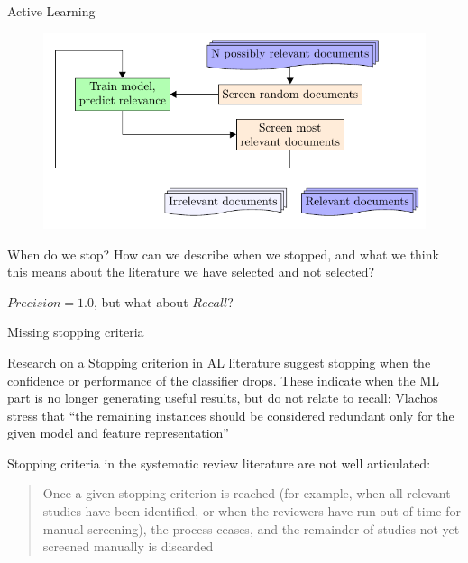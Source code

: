 \documentclass[9pt]{beamer}
\begin{document}
\begin{frame}{Active Learning} 

\begin{figure}
	\includegraphics[width=0.8\linewidth]{../images/flow_basic.pdf}
\end{figure}

When do we stop? How can we describe when we stopped, and what we think this means about the literature we have selected and not selected?

$ Precision=1.0 $, but what about $Recall$?

\end{frame}

\begin{frame}{Missing stopping criteria}


Research on a Stopping criterion in AL literature suggest stopping when the confidence or performance of the classifier drops. These indicate when the ML part is no longer generating useful results, but do not relate to recall: Vlachos stress that ``the remaining instances should be considered redundant only for the given model and feature representation'' \cite{Vlachos2008}

\medskip
 
Stopping criteria in the systematic review literature are not well articulated:

\blockcquote{miwa2014}{Once a given stopping criterion is reached (for example, when all relevant studies have been identified, or when the reviewers have run out of time for manual screening), the process ceases, and the remainder of studies not yet screened manually is discarded}

\end{frame}
\end{document}
